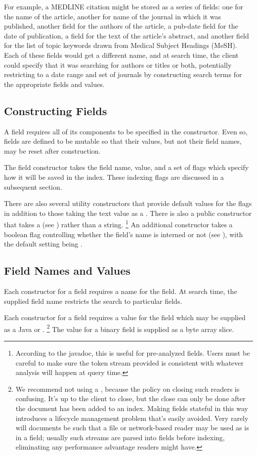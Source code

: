 For example, a MEDLINE citation might be stored as a series
of fields: one for the name of the article, another for name of
the journal in which it was published, another field for the authors
of the article, a pub-date field for the date of publication, a field
for the text of the article's abstract, and another field for the list
of topic keywords drawn from Medical Subject Headings (MeSH).  Each of
these fields would get a different name, and at search time, the
client could specify that it was searching for authors or titles or
both, potentially restricting to a date range and set of journals
by constructing search terms for the appropriate fields and values.

\subsection{Constructing Fields}

A field requires all of its components to be specified in the
constructor.  Even so, fields are defined to be mutable so that their
values, but not their field names, may be reset after construction.

The field constructor takes the field name, value, and a set of flags
which specify how it will be saved in the index.
These indexing flags are discussed in a subsequent section.

There are also several utility constructors that provide default
values for the flags in addition to those taking the text value as a
.  There is also a public constructor that takes a
 (see ) rather than a
string.%
%
\footnote{According to the javadoc,
this is useful for pre-analyzed fields.
Users must be careful to make sure the token stream provided is
consistent with whatever analysis will happen at query time.}
%
An additional constructor takes a boolean flag controlling whether
the field's name is interned or not (see ), with
the default setting being .


\subsection{Field Names and Values}

Each constructor for a field requires a name for the field.  At search
time, the supplied field name restricts the search to particular
fields.  

Each constructor for a field requires a value for the field
which may be supplied as a Java  or .%
%
\footnote{We recommend not using a , because the policy
  on closing such readers is confusing.  It's up to the client to
  close, but the close can only be done after the document has been
  added to an index.  Making fields stateful in this way introduces a
  lifecycle management problem that's easily avoided.  Very rarely
  will documents be such that a file or network-based reader may be
  used as is in a field; usually such streams are parsed into fields
  before indexing, eliminating any performance advantage readers might
  have.}
%
The value for a binary field is supplied as a byte array slice.

